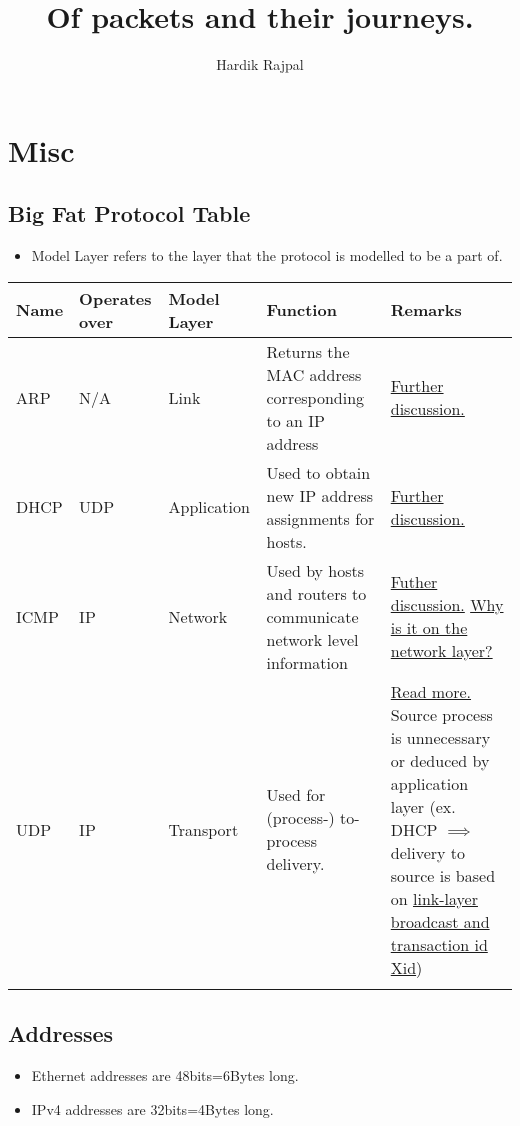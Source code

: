 \documentclass{report}
\author{Hardik Rajpal}
\title{Of packets and their journeys.}
\newcommand{\protorow}[5]{#1 & #2 & #3 & #4 & #5\\ \hline}
\begin{document}
\maketitle
\tableofcontents
\chapter{Misc}
\section{Big Fat Protocol Table}
\begin{itemize}
\item Model Layer refers to the layer that the protocol is modelled to be a part of.
\end{itemize}
\begin{center}
\begin{tabular}{| p{1cm} | p{2cm} | p{2.5cm} | p{5cm} | p{4cm} | }
\hline
\protorow{Name}{Operates over}{Model Layer}{Function}{Remarks}
\protorow{ARP}{N/A}{Link}{Returns the MAC address corresponding to an IP address}{\hyperref[sec:arp]{Further discussion.}}
\protorow{DHCP}{UDP}{Application}{Used to obtain new IP address assignments for hosts.}{\hyperref[sec:dhcp]{Further discussion.}}
\protorow{ICMP}{IP}{Network}{Used by hosts and routers to communicate network level information}{\hyperref[sec:icmp]{Futher discussion.} \href{https://serverfault.com/questions/511965/why-is-icmp-categorized-as-a-layer-3-protocol}{Why is it on the network layer?}}
\protorow{UDP}{IP}{Transport}{Used for (process-) to-process delivery.}{\hyperref[sec:udp]{Read more.} Source process is unnecessary or deduced by application layer (ex. DHCP $\implies$ delivery to source is based on \hyperref[sec:dhcp]{link-layer broadcast and transaction id Xid})}
\protorow{}{}{}{}{}
\end{tabular}
\end{center}
\section{Addresses}
\begin{itemize}
\item Ethernet addresses are 48bits=6Bytes long.
\item IPv4 addresses are 32bits=4Bytes long.
\end{itemize}
\end{document}
